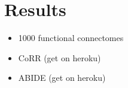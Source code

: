 \section{Results}
\begin{itemize}
\item 1000 functional connectomes
\item CoRR (get on heroku)
\item ABIDE  (get on heroku)
\end{itemize}

